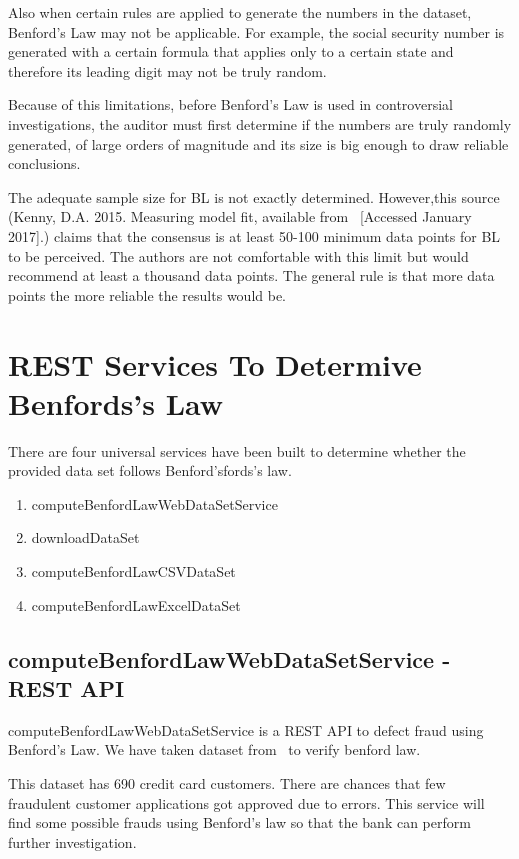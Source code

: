 Also when certain rules are applied to generate 
the numbers in the dataset, Benford’s Law may not be applicable.
For example, the social security number is generated with a 
certain formula that applies only to a certain state 
and therefore its leading digit may not be truly random. 

Because of this limitations, before Benford’s Law is
used in controversial investigations, the auditor must 
first determine if the numbers are truly randomly generated, 
of large orders of magnitude and its size is big enough 
to draw reliable conclusions.

The adequate sample size for BL is not exactly 
determined. However,this source 
(Kenny, D.A. 2015. Measuring model fit, 
available from~\cite{hid-sp18-514-Kenny-Measuring-model}
[Accessed January 2017].)  
claims that the consensus is at least 50-100 minimum data 
points for BL to be perceived. The authors are not 
comfortable with this limit but would recommend at least 
a thousand data points. The general rule is that more 
data points the more reliable the results would be.

\section{REST Services To Determive Benfords's Law}

There are four universal services have been built to determine
whether the provided data set follows Benford’sfords's law.

\begin{enumerate}
 \item computeBenfordLawWebDataSetService
 \item downloadDataSet
 \item computeBenfordLawCSVDataSet
 \item computeBenfordLawExcelDataSet
\end{enumerate}

\subsection{computeBenfordLawWebDataSetService - REST API}
computeBenfordLawWebDataSetService is 
a REST API to defect fraud using Benford's Law.
We have taken dataset from~\cite{hid-sp18-514-aust-cc-benford}
to verify benford law.

This dataset has 690 credit card customers.
There are chances that few fraudulent customer 
applications got approved due to errors. 
This service will find some possible frauds using 
Benford's law so that the bank can perform
further investigation.

